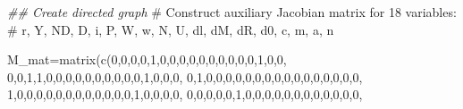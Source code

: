 \documentclass[
  letterpaper,
  DIV=11,
  numbers=noendperiod]{scrreprt}
\newenvironment{Shaded}{\begin{snugshade}}{\end{snugshade}}
\newcommand{\CommentTok}[1]{\textcolor[rgb]{0.37,0.37,0.37}{#1}}
\newcommand{\DecValTok}[1]{\textcolor[rgb]{0.68,0.00,0.00}{#1}}
\newcommand{\DocumentationTok}[1]{\textcolor[rgb]{0.37,0.37,0.37}{\textit{#1}}}
\newcommand{\FunctionTok}[1]{\textcolor[rgb]{0.28,0.35,0.67}{#1}}
\newcommand{\NormalTok}[1]{\textcolor[rgb]{0.00,0.23,0.31}{#1}}
\newcommand{\OtherTok}[1]{\textcolor[rgb]{0.00,0.23,0.31}{#1}}
\begin{document}
\begin{Shaded}
\begin{Highlighting}[]
\DocumentationTok{\#\# Create directed graph }
\CommentTok{\# Construct auxiliary Jacobian matrix for 18 variables: }
\CommentTok{\# r, Y, ND, D, i, P, W, w, N, U, dl, dM, dR, d0, c, m, a, n }

\NormalTok{M\_mat}\OtherTok{=}\FunctionTok{matrix}\NormalTok{(}\FunctionTok{c}\NormalTok{(}\DecValTok{0}\NormalTok{,}\DecValTok{0}\NormalTok{,}\DecValTok{0}\NormalTok{,}\DecValTok{0}\NormalTok{,}\DecValTok{1}\NormalTok{,}\DecValTok{0}\NormalTok{,}\DecValTok{0}\NormalTok{,}\DecValTok{0}\NormalTok{,}\DecValTok{0}\NormalTok{,}\DecValTok{0}\NormalTok{,}\DecValTok{0}\NormalTok{,}\DecValTok{0}\NormalTok{,}\DecValTok{0}\NormalTok{,}\DecValTok{0}\NormalTok{,}\DecValTok{0}\NormalTok{,}\DecValTok{1}\NormalTok{,}\DecValTok{0}\NormalTok{,}\DecValTok{0}\NormalTok{,}
               \DecValTok{0}\NormalTok{,}\DecValTok{0}\NormalTok{,}\DecValTok{1}\NormalTok{,}\DecValTok{1}\NormalTok{,}\DecValTok{0}\NormalTok{,}\DecValTok{0}\NormalTok{,}\DecValTok{0}\NormalTok{,}\DecValTok{0}\NormalTok{,}\DecValTok{0}\NormalTok{,}\DecValTok{0}\NormalTok{,}\DecValTok{0}\NormalTok{,}\DecValTok{0}\NormalTok{,}\DecValTok{0}\NormalTok{,}\DecValTok{0}\NormalTok{,}\DecValTok{1}\NormalTok{,}\DecValTok{0}\NormalTok{,}\DecValTok{0}\NormalTok{,}\DecValTok{0}\NormalTok{,}
               \DecValTok{0}\NormalTok{,}\DecValTok{1}\NormalTok{,}\DecValTok{0}\NormalTok{,}\DecValTok{0}\NormalTok{,}\DecValTok{0}\NormalTok{,}\DecValTok{0}\NormalTok{,}\DecValTok{0}\NormalTok{,}\DecValTok{0}\NormalTok{,}\DecValTok{0}\NormalTok{,}\DecValTok{0}\NormalTok{,}\DecValTok{0}\NormalTok{,}\DecValTok{0}\NormalTok{,}\DecValTok{0}\NormalTok{,}\DecValTok{0}\NormalTok{,}\DecValTok{0}\NormalTok{,}\DecValTok{0}\NormalTok{,}\DecValTok{0}\NormalTok{,}\DecValTok{0}\NormalTok{,}
               \DecValTok{1}\NormalTok{,}\DecValTok{0}\NormalTok{,}\DecValTok{0}\NormalTok{,}\DecValTok{0}\NormalTok{,}\DecValTok{0}\NormalTok{,}\DecValTok{0}\NormalTok{,}\DecValTok{0}\NormalTok{,}\DecValTok{0}\NormalTok{,}\DecValTok{0}\NormalTok{,}\DecValTok{0}\NormalTok{,}\DecValTok{0}\NormalTok{,}\DecValTok{0}\NormalTok{,}\DecValTok{0}\NormalTok{,}\DecValTok{1}\NormalTok{,}\DecValTok{0}\NormalTok{,}\DecValTok{0}\NormalTok{,}\DecValTok{0}\NormalTok{,}\DecValTok{0}\NormalTok{,}
               \DecValTok{0}\NormalTok{,}\DecValTok{0}\NormalTok{,}\DecValTok{0}\NormalTok{,}\DecValTok{0}\NormalTok{,}\DecValTok{0}\NormalTok{,}\DecValTok{1}\NormalTok{,}\DecValTok{0}\NormalTok{,}\DecValTok{0}\NormalTok{,}\DecValTok{0}\NormalTok{,}\DecValTok{0}\NormalTok{,}\DecValTok{0}\NormalTok{,}\DecValTok{0}\NormalTok{,}\DecValTok{0}\NormalTok{,}\DecValTok{0}\NormalTok{,}\DecValTok{0}\NormalTok{,}\DecValTok{0}\NormalTok{,}\DecValTok{0}\NormalTok{,}\DecValTok{0}\NormalTok{,}

\end{Highlighting}
\end{Shaded}
\end{document}
